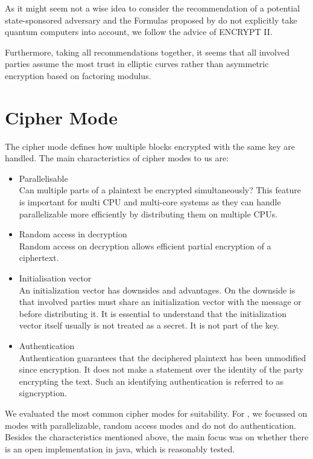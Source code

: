 As it might seem not a wise idea to consider the recommendation of a potential state-sponsored adversary and the Formulas proposed by \citeauthor{Lenstra04keylength.} do not explicitly take quantum computers into account, we follow the advice of ENCRYPT II.

Furthermore, taking all recommendations together, it seems that all involved parties assume the most trust in elliptic curves rather than asymmetric encryption based on factoring modulus.

\section{Cipher Mode}
The cipher mode defines how multiple blocks encrypted with the same key are handled. The main characteristics of cipher modes to us are:
\begin{itemize}
	\item Parallelisable\\ 
	Can multiple parts of a plaintext be encrypted simultaneously? This feature is important for multi CPU and multi-core systems as they can handle parallelizable more efficiently by distributing them on multiple CPUs.
	\item Random access in decryption\\
	Random access on decryption allows efficient partial encryption of a ciphertext.
	\item Initialisation vector\\
	An initialization vector has downsides and advantages. On the downside is that involved parties must share an initialization vector with the message or before distributing it. It is essential to understand that the initialization vector itself usually is not treated as a secret. It is not part of the key.
	\item Authentication\\
	Authentication guarantees that the deciphered plaintext has been unmodified since encryption. It does not make a statement over the identity of the party encrypting the text. Such an identifying authentication is referred to as signcryption.
\end{itemize}

We evaluated the most common cipher modes for suitability. For \MessageVortex, we focussed on modes with parallelizable, random access modes and do not do authentication. Besides the characteristics mentioned above, the main focus was on whether there is an open implementation in java, which is reasonably tested.

